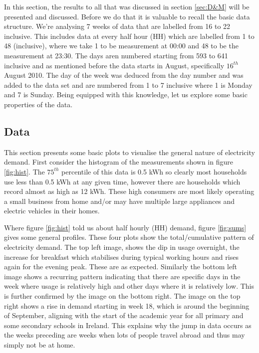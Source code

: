 \documentclass[a4paper]{article}
\begin{document}
In this section, the results to all that was discussed in section \ref{sec:D&M} will be presented and discussed.
Before we do that it is valuable to recall the basic data structure. We're analysing 7 weeks of data that are labelled from 16 to 22 inclusive. This includes data at every half hour (HH) which are labelled from 1 to 48 (inclusive), where we take 1 to be measurement at 00:00 and 48 to be the measurement at 23:30. The days aren numbered starting from 593 to 641 inclusive and as mentioned before the data starts in August, specifically $16^{th}$ August 2010. The day of the week was deduced from the day number and was added to the data set and are numbered from 1 to 7 inclusive where 1 is Monday and 7 is Sunday. Being equipped with this knowledge, let us explore some basic properties of the data.

\subsection{Data}
\label{subsec:basic} 
This section presents some basic plots to visualise the general nature of electricity demand. First consider the histogram of the measurements shown in figure \ref{fig:hist}. The $75^{th}$ percentile of this data is 0.5 kWh so clearly most households use less than 0.5 kWh at any given time, however there are households which record almost as high as 12 kWh. These high consumers are most likely operating a small business from home and/or may have multiple large appliances and electric vehicles in their homes.

Where figure \ref{fig:hist} told us about half hourly (HH) demand, figure \ref{fig:sums} gives some general profiles. These four plots show the total/cumulative pattern of electricity demand. The top left image, shows the dip in usage overnight, the increase for breakfast which stabilises during typical working hours and rises again for the evening peak. These are as expected. Similarly the bottom left image shows a recurring pattern indicating that there are specific days in the week where usage is relatively high and other days where it is relatively low. This is further confirmed by the image on the bottom right. The image on the top right shows a rise in demand starting in week 18, which is around the beginning of September, aligning with the start of the academic year for all primary and some secondary schools in Ireland. This explains why the jump in data occurs as the weeks preceding are weeks when lots of people travel abroad and thus may simply not be at home.
\end{document}
